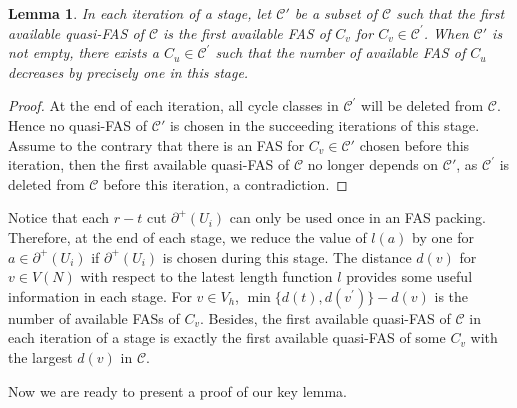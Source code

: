 \documentclass[11pt]{article}
\newtheorem{lemma}[theorem]{Lemma}
\begin{document}
\begin{lemma}
\label{lem:4} 
In each iteration of a stage, let $\mathcal{C}'$ be a subset of $\mathcal{C}$ such that the first available quasi-FAS of $\mathcal{C}$ is the first available FAS of $C_v$ for $C_v \in\mathcal{C}^\prime$. When $\mathcal{C}'$ is not empty,  there exists a $C_u\in \mathcal{C}^\prime$ such that the number of available FAS of $C_u$ decreases by precisely one in this stage.
\end{lemma}

\begin{proof}
At the end of each iteration, all cycle classes in $\mathcal{C}^\prime$ will be deleted from $\mathcal{C}$. Hence no quasi-FAS of $\mathcal{C}'$ is chosen in the succeeding iterations of this stage. Assume to the contrary that there is an FAS for $C_v\in\mathcal{C}'$ chosen before this iteration, then the first available quasi-FAS of $\mathcal{C}$ no longer depends on $\mathcal{C}'$, as $\mathcal{C}^\prime$ is deleted from $\mathcal{C}$ before this iteration, a contradiction.
\end{proof}

Notice that each $r-t$ cut $\partial^+(U_i)$ can only be used once in an FAS packing. Therefore, at the end of each stage, we reduce the value of $l(a)$ by one for $a\in \partial^+(U_i)$ if $\partial^+(U_i)$ is chosen during this stage. The distance $d(v)$ for $v\in V(N)$ with respect to the latest length function $l$ provides some useful information in each stage. For $v\in V_h$, $\min\{d(t),d(v^\prime)\}-d(v)$ is the number of available FASs of $C_v$. Besides, the first available quasi-FAS of $\mathcal{C}$ in each iteration of a stage is exactly the first available quasi-FAS of some $C_v$ with the largest $d(v)$ in $\mathcal{C}$.

Now we are ready to present a proof of our key lemma.
\end{document}
